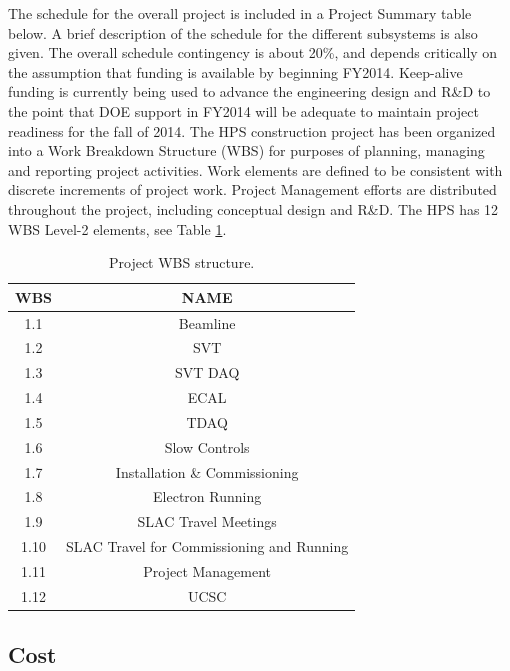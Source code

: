 The schedule for the overall project is included in a Project Summary table below. A brief description of the schedule for the 
different subsystems is also given. The overall schedule contingency is about 20\%, and depends critically on the assumption that 
funding is available by beginning FY2014. Keep-alive funding is currently being used to advance the engineering design and R\&D to the point
that DOE support in FY2014 will be adequate to maintain project readiness for the fall of 2014. The HPS construction project has been organized 
into a Work Breakdown Structure (WBS) for purposes of planning, 
managing and reporting project activities. Work elements are defined to be consistent with discrete increments of project work. 
Project Management efforts are distributed throughout the project, including conceptual design and R\&D. The HPS has 12 WBS
 Level-2 elements, see Table \ref{tb:wbs}. 

\begin{table}[htdp]
\caption{Project WBS structure.}
\begin{center}
\begin{tabular}{|c|c|}
\hline
WBS& NAME \\
\hline\hline
1.1 & Beamline \\
\hline
1.2 & SVT \\
\hline
1.3 & SVT DAQ \\
\hline
1.4 & ECAL \\
\hline
1.5 & TDAQ \\
\hline
1.6 & Slow Controls \\
\hline
1.7 & Installation \& Commissioning \\
\hline
1.8 & Electron Running \\
\hline
1.9 & SLAC Travel Meetings \\
\hline
1.10 & SLAC Travel for Commissioning and Running \\
\hline
1.11 & Project Management  \\
\hline
1.12 & UCSC  \\
\hline
\hline
\end{tabular}
\end{center}
\label{tb:wbs}
\end{table}%

\subsection{Cost}

